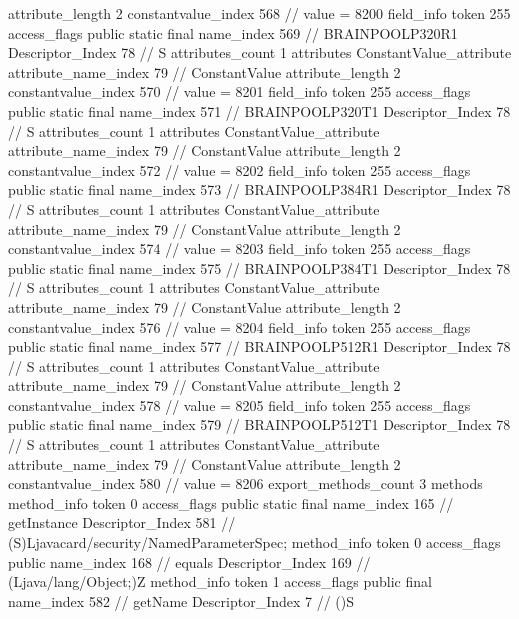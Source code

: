 {{{{{{{					attribute_length	2
					constantvalue_index	568		// value = 8200
				}
				}
			}
			field_info {
				token	255
				access_flags	public static final
				name_index	569		// BRAINPOOLP320R1
				Descriptor_Index	78		// S
				attributes_count	1
				attributes {
				ConstantValue_attribute {
					attribute_name_index	79		// ConstantValue
					attribute_length	2
					constantvalue_index	570		// value = 8201
				}
				}
			}
			field_info {
				token	255
				access_flags	public static final
				name_index	571		// BRAINPOOLP320T1
				Descriptor_Index	78		// S
				attributes_count	1
				attributes {
				ConstantValue_attribute {
					attribute_name_index	79		// ConstantValue
					attribute_length	2
					constantvalue_index	572		// value = 8202
				}
				}
			}
			field_info {
				token	255
				access_flags	public static final
				name_index	573		// BRAINPOOLP384R1
				Descriptor_Index	78		// S
				attributes_count	1
				attributes {
				ConstantValue_attribute {
					attribute_name_index	79		// ConstantValue
					attribute_length	2
					constantvalue_index	574		// value = 8203
				}
				}
			}
			field_info {
				token	255
				access_flags	public static final
				name_index	575		// BRAINPOOLP384T1
				Descriptor_Index	78		// S
				attributes_count	1
				attributes {
				ConstantValue_attribute {
					attribute_name_index	79		// ConstantValue
					attribute_length	2
					constantvalue_index	576		// value = 8204
				}
				}
			}
			field_info {
				token	255
				access_flags	public static final
				name_index	577		// BRAINPOOLP512R1
				Descriptor_Index	78		// S
				attributes_count	1
				attributes {
				ConstantValue_attribute {
					attribute_name_index	79		// ConstantValue
					attribute_length	2
					constantvalue_index	578		// value = 8205
				}
				}
			}
			field_info {
				token	255
				access_flags	public static final
				name_index	579		// BRAINPOOLP512T1
				Descriptor_Index	78		// S
				attributes_count	1
				attributes {
				ConstantValue_attribute {
					attribute_name_index	79		// ConstantValue
					attribute_length	2
					constantvalue_index	580		// value = 8206
				}
				}
			}
			}
			export_methods_count	3
			methods {
				method_info {
					token	0
					access_flags	public static final
					name_index	165		// getInstance
					Descriptor_Index	581		// (S)Ljavacard/security/NamedParameterSpec;
				}
				method_info {
					token	0
					access_flags	public
					name_index	168		// equals
					Descriptor_Index	169		// (Ljava/lang/Object;)Z
				}
				method_info {
					token	1
					access_flags	public final
					name_index	582		// getName
					Descriptor_Index	7		// ()S
}}}}}
